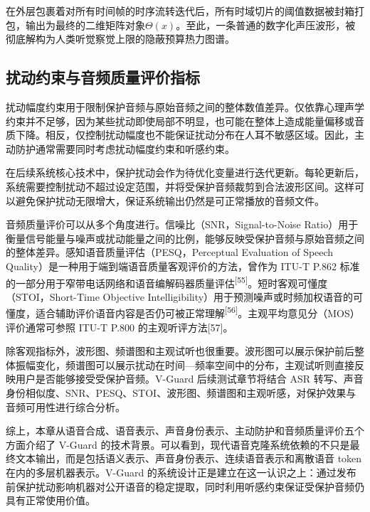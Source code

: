 在外层包裹着对所有时间帧的时序流转迭代后，所有时域切片的阈值数据被封箱打包，输出为最终的二维矩阵对象\(\Theta(x)\)。至此，一条普通的数字化声压波形，被彻底解构为人类听觉察觉上限的隐蔽预算热力图谱。

\subsection{扰动约束与音频质量评价指标}\label{ux6270ux52a8ux7ea6ux675fux4e0eux97f3ux9891ux8d28ux91cfux8bc4ux4ef7ux6307ux6807}

扰动幅度约束用于限制保护音频与原始音频之间的整体数值差异。仅依靠心理声学约束并不足够，因为某些扰动即使局部不明显，也可能在整体上造成能量偏移或音质下降。相反，仅控制扰动幅度也不能保证扰动分布在人耳不敏感区域。因此，主动防护通常需要同时考虑扰动幅度约束和听感约束。

在后续系统核心技术中，保护扰动会作为待优化变量进行迭代更新。每轮更新后，系统需要控制扰动不超过设定范围，并将受保护音频裁剪到合法波形区间。这样可以避免保护扰动无限增大，保证系统输出仍然是可正常播放的音频文件。

音频质量评价可以从多个角度进行。信噪比（SNR，Signal-to-Noise
Ratio）用于衡量信号能量与噪声或扰动能量之间的比例，能够反映受保护音频与原始音频之间的整体差异。感知语音质量评估（PESQ，Perceptual
Evaluation of Speech
Quality）是一种用于端到端语音质量客观评价的方法，曾作为 ITU-T P.862
标准的一部分用于窄带电话网络和语音编解码器质量评估\textsuperscript{{[}55{]}}。短时客观可懂度（STOI，Short-Time
Objective
Intelligibility）用于预测噪声或时频加权语音的可懂度，适合辅助评价语音内容是否仍可被正常理解\textsuperscript{{[}56{]}}。主观平均意见分（MOS）评价通常可参照
ITU-T P.800 的主观听评方法{[}57{]}。

除客观指标外，波形图、频谱图和主观试听也很重要。波形图可以展示保护前后整体振幅变化，频谱图可以展示扰动在时间---频率空间中的分布，主观试听则直接反映用户是否能够接受受保护音频。V-Guard
后续测试章节将结合 ASR
转写、声音身份相似度、SNR、PESQ、STOI、波形图、频谱图和主观听感，对保护效果与音频可用性进行综合分析。

综上，本章从语音合成、语音表示、声音身份表示、主动防护和音频质量评价五个方面介绍了
V-Guard
的技术背景。可以看到，现代语音克隆系统依赖的不只是最终文本输出，而是包括语义表示、声音身份表示、连续语音表示和离散语音
token 在内的多层机器表示。V-Guard
的系统设计正是建立在这一认识之上：通过发布前保护扰动影响机器对公开语音的稳定提取，同时利用听感约束保证受保护音频仍具有正常使用价值。

\FloatBarrier
